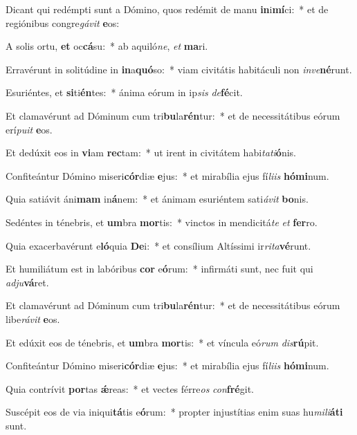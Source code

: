\item Dicant qui redémpti sunt a Dómino, quos redémit de manu \textbf{in}i\textbf{mí}ci:~* et de regiónibus congre\textit{gá}\textit{vit} \textbf{e}os:
\item A solis ortu, \textbf{et} oc\textbf{cá}su:~* ab aquiló\textit{ne}, \textit{et} \textbf{ma}ri.
\item Erravérunt in solitúdine in \textbf{in}a\textbf{quó}so:~* viam civitátis habitáculi non \textit{in}\textit{ve}\textbf{né}runt.
\item Esuriéntes, et \textbf{si}ti\textbf{én}tes:~* ánima eórum in ip\textit{sis} \textit{de}\textbf{fé}cit.
\item Et clamavérunt ad Dóminum cum tri\textbf{bu}la\textbf{rén}tur:~* et de necessitátibus eórum erí\textit{pu}\textit{it} \textbf{e}os.
\item Et dedúxit eos in \textbf{vi}am \textbf{rec}tam:~* ut irent in civitátem habi\textit{ta}\textit{ti}\textbf{ó}nis.
\item Confiteántur Dómino miseri\textbf{cór}diæ \textbf{e}jus:~* et mirabília ejus fí\textit{li}\textit{is} \textbf{hó}\textbf{mi}num.
\item Quia satiávit áni\textbf{mam} in\textbf{á}nem:~* et ánimam esuriéntem sati\textit{á}\textit{vit} \textbf{bo}nis.
\item Sedéntes in ténebris, et \textbf{um}bra \textbf{mor}tis:~* vinctos in mendicitá\textit{te} \textit{et} \textbf{fer}ro.
\item Quia exacerbavérunt e\textbf{ló}quia \textbf{De}i:~* et consílium Altíssimi ir\textit{ri}\textit{ta}\textbf{vé}runt.
\item Et humiliátum est in labóribus \textbf{cor} e\textbf{ó}rum:~* infirmáti sunt, nec fuit qui \textit{ad}\textit{ju}\textbf{vá}ret.
\item Et clamavérunt ad Dóminum cum tri\textbf{bu}la\textbf{rén}tur:~* et de necessitátibus eórum libe\textit{rá}\textit{vit} \textbf{e}os.
\item Et edúxit eos de ténebris, et \textbf{um}bra \textbf{mor}tis:~* et víncula eó\textit{rum} \textit{dis}\textbf{rú}pit.
\item Confiteántur Dómino miseri\textbf{cór}diæ \textbf{e}jus:~* et mirabília ejus fí\textit{li}\textit{is} \textbf{hó}\textbf{mi}num.
\item Quia contrívit \textbf{por}tas \textbf{ǽ}reas:~* et vectes férre\textit{os} \textit{con}\textbf{fré}git.
\item Suscépit eos de via iniqui\textbf{tá}tis e\textbf{ó}rum:~* propter injustítias enim suas hu\textit{mi}\textit{li}\textbf{á}\textbf{ti} sunt.
